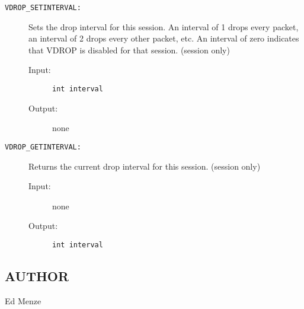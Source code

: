 \begin{description}

\item[{\tt VDROP\_SETINTERVAL:}]
Sets the drop interval for this session.  An interval of 1 drops every
packet, an interval of 2 drops every other packet, etc.  An interval
of zero indicates that VDROP is disabled for that session.  (session only)
\begin{description}
\item[{\rm Input:}] {\tt int interval}
\item[{\rm Output:}] none
\end{description}


\item[{\tt VDROP\_GETINTERVAL:}]
Returns the current drop interval for this session.
(session only)
\begin{description}
\item[{\rm Input:}] none
\item[{\rm Output:}] {\tt int interval}
\end{description}


\end{description}



\subsection*{AUTHOR}

\noindent Ed Menze
